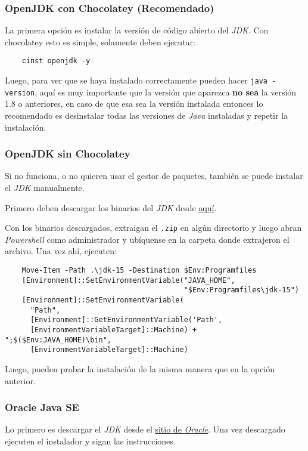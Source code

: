 \subsubsection{OpenJDK con Chocolatey (Recomendado)}
  La primera opción es instalar la versión de código abierto del \textit{JDK}.
  Con chocolatey esto es simple, solamente deben ejecutar:
  \begin{verbatim}
    cinst openjdk -y
  \end{verbatim}
  
  Luego, para ver que se haya instalado correctamente pueden hacer \texttt{java -version}, aquí es
  muy importante que la versión que aparezca \textbf{no sea} la versión 1.8 o anteriores, en caso 
  de que esa sea la versión instalada entonces lo recomendado es desinstalar todas las versiones
  de \textit{Java} instaladas y repetir la instalación.

\subsubsection{OpenJDK sin Chocolatey}
  Si no funciona, o no quieren usar el gestor de paquetes, también se puede instalar el 
  \textit{JDK} manualmente.
  
  Primero deben descargar los binarios del \textit{JDK} desde 
  \href{
    https://download.java.net/java/GA/jdk15.0.2/0d1cfde4252546c6931946de8db48ee2/7/GPL/openjdk-15.0.2_windows-x64_bin.zip
    }{aquí}.
  
  Con los binarios descargados, extraigan el \texttt{.zip} en algún directorio y luego 
  abran \textit{Powershell} como administrador y ubíquense en la carpeta donde extrajeron el 
  archivo.
  Una vez ahí, ejecuten:

  \begin{verbatim}
    Move-Item -Path .\jdk-15 -Destination $Env:Programfiles
    [Environment]::SetEnvironmentVariable("JAVA_HOME", 
                                          "$Env:Programfiles\jdk-15")
    [Environment]::SetEnvironmentVariable(
      "Path", 
      [Environment]::GetEnvironmentVariable('Path', 
      [EnvironmentVariableTarget]::Machine) + ";$($Env:JAVA_HOME)\bin", 
      [EnvironmentVariableTarget]::Machine)
  \end{verbatim}

  Luego, pueden probar la instalación de la misma manera que en la opción anterior.

  \subsubsection{Oracle Java SE}
    Lo primero es descargar el \textit{JDK} desde el 
    \href{
      https://www.oracle.com/java/technologies/javase-jdk15-downloads.html
    }{sitio de \textit{Oracle}}. 
    Una vez descargado ejecuten el instalador y sigan las instrucciones.

